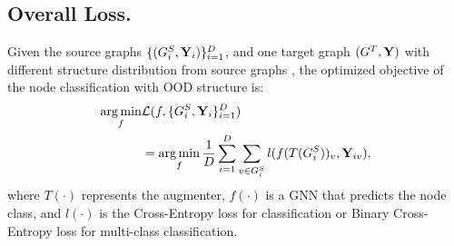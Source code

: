 \subsection{Overall Loss.} 
Given the source graphs $\{(G^S_i, \mathbf{Y}_i)\}_{i=1}^{D}$,
and one target graph $(G^T, \mathbf{Y})$ with different structure distribution from source graphs
, the optimized objective of the node classification with OOD structure is: 
\begin{equation}
\begin{aligned}
    \mathop{\arg\min}_{f} & \mathcal{L}(f,\{G^S_i, \mathbf{Y}_i\}_{i=1}^{D}) \\
    &= \mathop{\arg\min}_{f} \frac{1}{D}\sum_{i=1}^D \sum_{v\in G_i^S}  l(f(T(G^S_i))_v, \mathbf{Y}_{iv}),
\end{aligned}
\end{equation}
where $T(\cdot)$ represents the augmenter, $f(\cdot)$ is a GNN that predicts the node class, and $l(\cdot)$ is the Cross-Entropy loss for classification or Binary Cross-Entropy loss for multi-class classification. 